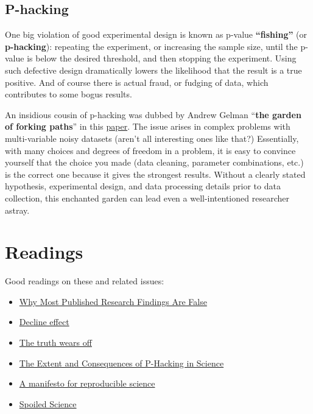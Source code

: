 \documentclass[
  letterpaper,
  DIV=11,
  numbers=noendperiod]{scrreprt}
\providecommand{\tightlist}{%
  \setlength{\itemsep}{0pt}\setlength{\parskip}{0pt}}\usepackage{longtable,booktabs,array}
\begin{document}
\hypertarget{p-hacking}{%
\subsection{P-hacking}\label{p-hacking}}

One big violation of good experimental design is known as p-value
\textbf{``fishing''} (or \textbf{p-hacking}): repeating the experiment,
or increasing the sample size, until the p-value is below the desired
threshold, and then stopping the experiment. Using such defective design
dramatically lowers the likelihood that the result is a true positive.
And of course there is actual fraud, or fudging of data, which
contributes to some bogus results.

An insidious cousin of p-hacking was dubbed by Andrew Gelman
``\textbf{the garden of forking paths}'' in this
\href{http://www.stat.columbia.edu/~gelman/research/unpublished/p_hacking.pdf}{paper}.
The issue arises in complex problems with multi-variable noisy datasets
(aren't all interesting ones like that?) Essentially, with many choices
and degrees of freedom in a problem, it is easy to convince yourself
that the choice you made (data cleaning, parameter combinations, etc.)
is the correct one because it gives the strongest results. Without a
clearly stated hypothesis, experimental design, and data processing
details prior to data collection, this enchanted garden can lead even a
well-intentioned researcher astray.

\hypertarget{readings}{%
\section{Readings}\label{readings}}

Good readings on these and related issues:

\begin{itemize}
\tightlist
\item
  \href{https://journals.plos.org/plosmedicine/article?id=10.1371/journal.pmed.0020124}{Why
  Most Published Research Findings Are False}
\item
  \href{https://en.wikipedia.org/wiki/Decline_effect}{Decline effect}
\item
  \href{https://www.newyorker.com/magazine/2010/12/13/the-truth-wears-off}{The
  truth wears off}
\item
  \href{https://journals.plos.org/plosbiology/article?id=10.1371/journal.pbio.1002106}{The
  Extent and Consequences of P-Hacking in Science}
\item
  \href{https://www.nature.com/articles/s41562-016-0021}{A manifesto for
  reproducible science}
\item
  \href{https://www.chronicle.com/article/Spoiled-Science/239529}{Spoiled
  Science}
\end{itemize}
\end{document}

